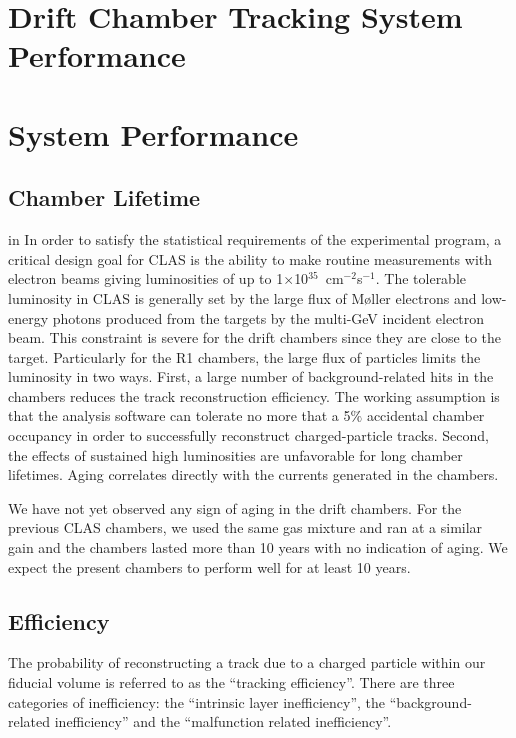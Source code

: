 \section{Drift Chamber Tracking System Performance}

\section{System Performance}

\subsection{Chamber Lifetime}
\label{choper}

 in 
In order to satisfy the statistical requirements of the experimental program, 
a critical design goal for CLAS is the ability to make routine measurements 
with electron beams giving luminosities of up to 
1$\times$10$^{35}$~cm$^{-2}$s$^{-1}$.  The tolerable luminosity in CLAS is 
generally set by the large flux of M{\o}ller electrons and low-energy photons 
produced from the targets by the multi-GeV incident electron beam.  This 
constraint is severe for the drift chambers since they are close to the 
target. Particularly for the R1 chambers, the large flux of 
particles limits the luminosity in two ways.  First, a large number of 
background-related hits in the chambers reduces the track reconstruction 
efficiency.  The working assumption is that the analysis software can tolerate 
no more that a 5$\%$ accidental chamber occupancy in order to successfully 
reconstruct charged-particle tracks.  Second, the effects of sustained high 
luminosities are unfavorable for long chamber lifetimes.  Aging correlates 
directly with the currents generated in the chambers.

We have not yet observed any sign of aging in the drift chambers.
For the previous CLAS chambers, we used the same gas mixture and ran at a
similar gain and the chambers lasted more than 10 years with no indication
of aging.  We expect the present
chambers to perform well for at least 10 years.


\subsection{Efficiency}

\hskip 0.15in
The probability of reconstructing a track due to a charged particle within
our fiducial volume is referred to as the ``tracking efficiency''.
There are three categories of inefficiency: the ``intrinsic layer inefficiency'',
the ``background-related inefficiency'' and the ``malfunction related 
inefficiency''.

